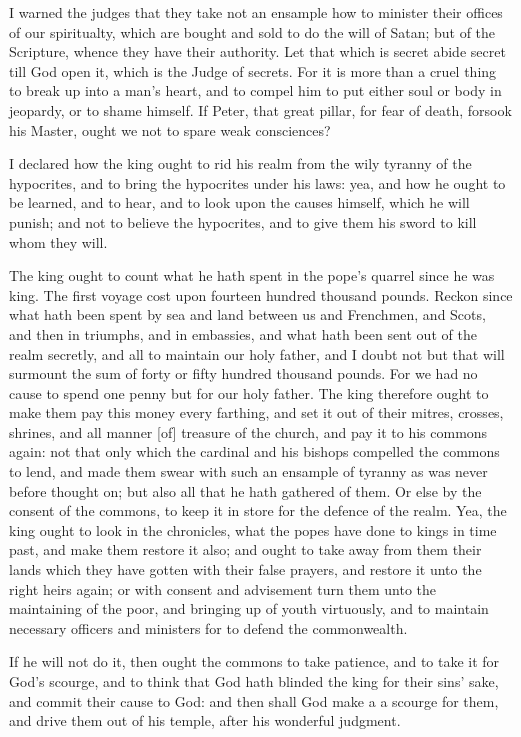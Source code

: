 I warned the judges that they take not an ensample 
how to minister their offices of our spiritualty, which are 
bought and sold to do the will of Satan; but of the 
Scripture, whence they have their authority. Let that 
which is secret abide secret till God open it, which is the 
Judge of secrets. For it is more than a cruel thing to 
break up into a man's heart, and to compel him to put 
either soul or body in jeopardy, or to shame himself. If 
Peter, that great pillar, for fear of death, forsook his 
Master, ought we not to spare weak consciences? 

I declared how the king ought to rid his realm from the 
wily tyranny of the hypocrites, and to bring the hypocrites 
under his laws: yea, and how he ought to be learned, and 
to hear, and to look upon the causes himself, which he 
will punish; and not to believe the hypocrites, and to 
give them his sword to kill whom they will. 

The king ought to count what he hath spent in the 
pope's quarrel since he was king. The first voyage 
cost upon fourteen hundred thousand pounds. Reckon 
since what hath been spent by sea and land between us 
and Frenchmen, and Scots, and then in triumphs, and in 
embassies, and what hath been sent out of the realm secretly,
and all to maintain our holy father, and I doubt 
not but that will surmount the sum of forty or fifty hundred 
thousand pounds. For we had no cause to spend one 
penny but for our holy father. The king therefore ought 
to make them pay this money every farthing, and set it out 
of their mitres, crosses, shrines, and all manner [of] treasure
of the church, and pay it to his commons again: 
not that only which the cardinal and his bishops compelled
the commons to lend, and made them swear with 
such an ensample of tyranny as was never before thought 
on; but also all that he hath gathered of them. Or else 
by the consent of the commons, to keep it in store for the 
defence of the realm. Yea, the king ought to look in 
the chronicles, what the popes have done to kings in time 
past, and make them restore it also; and ought to take 
away from them their lands which they have gotten with 
their false prayers, and restore it unto the right heirs again; 
or with consent and advisement turn them unto the maintaining
of the poor, and bringing up of youth virtuously, 
and to maintain necessary officers and ministers for to 
defend the commonwealth. 

If he will not do it, then ought the commons to take 
patience, and to take it for God's scourge, and to think 
that God hath blinded the king for their sins' sake, and 
commit their cause to God: and then shall God make a 
a scourge for them, and drive them out of his temple, 
after his wonderful judgment. 

